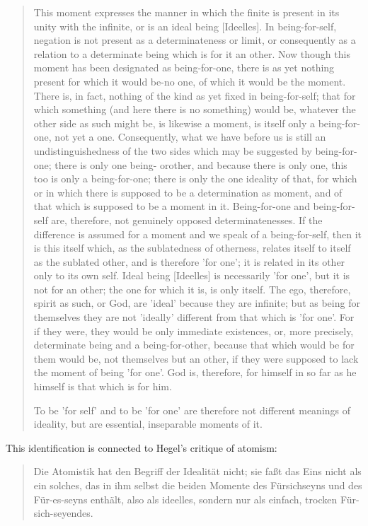 \documentclass{article}
\begin{document}
\begin{quote}
     This moment expresses the manner in which the finite is present in its unity with the infinite, or is an ideal being [Ideelles]. In being-for-self, negation is not present as a determinateness or limit, or consequently as a relation to a determinate being which is for it an other. Now though this moment has been designated as being-for-one, there is as yet nothing present for which it would be-no one, of which it would be the moment. There is, in fact, nothing of the kind as yet fixed in being-for-self; that for which something (and here there is no something) would be, whatever the other side as such might be, is likewise a moment, is itself only a being-for-one, not yet a one. Consequently, what we have before us is still an undistinguishedness of the two sides which may be suggested by being-for-one; there is only one being- orother, and because there is only one, this too is only a being-for-one; there is only the one ideality of that, for which or in which there is supposed to be a determination as moment, and of that which is supposed to be a moment in it. Being-for-one and being-for-self are, therefore, not genuinely opposed determinatenesses. If the difference is assumed for a moment and we speak of a being-for-self, then it is this itself which, as the sublatedness of otherness, relates itself to itself as the sublated other, and is therefore 'for one'; it is related in its other only to its own self. Ideal being [Ideelles] is necessarily 'for one', but it is not for an other; the one for which it is, is only itself. The ego, therefore, spirit as such, or God, are 'ideal' because they are infinite; but as being for themselves they are not 'ideally' different from that which is 'for one'. For if they were, they would be only immediate existences, or, more precisely, determinate being and a being-for-other, because that which would be for them would be, not themselves but an other, if they were supposed to lack the moment of being 'for one'. God is, therefore, for himself in so far as he himself is that which is for him.

    To be 'for self' and to be 'for one' are therefore not different
    meanings of ideality, but are essential, inseparable 
    moments of it.
\end{quote}

This identification is connected to Hegel's critique of atomism:

\begin{quote}
     Die Atomistik hat den Begriff der Idealität nicht; sie faßt das Eins nicht als ein solches, das in ihm selbst die beiden Momente des Fürsichseyns und des Für-es-seyns enthält, also als ideelles, sondern nur als einfach, trocken Für-sich-seyendes.
\end{quote}
\end{document}

